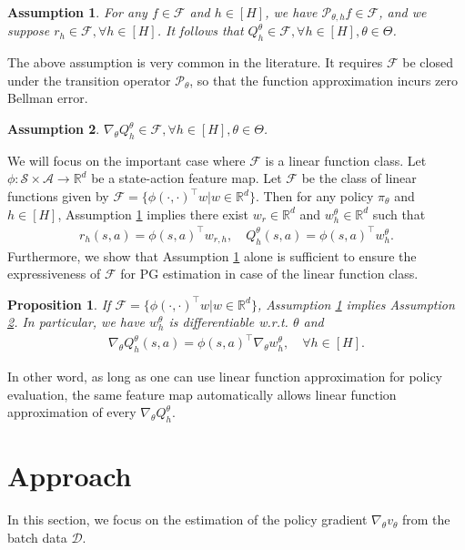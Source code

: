 \documentclass{article}
\newtheorem{assumption}{Assumption}[section]
\newtheorem{proposition}{Proposition}[section]
\numberwithin{equation}{section}
\begin{document}
\begin{assumption}
\label{fclass}
For any $f\in\mathcal{F}$ and $h\in[H]$, we have $\mathcal{P}_{\theta, h} f\in\mathcal{F}$, and we suppose $r_h\in\mathcal{F}, \forall h\in[H]$. It follows that $Q^{\theta}_h\in\mathcal{F}, \forall h\in[H],\theta\in\Theta$.
\end{assumption}
The above assumption is very common in the literature. It requires $\mathcal{F}$ be closed under the transition operator $\mathcal{P}_\theta$, so that the function approximation incurs zero Bellman error. 
\begin{assumption}
\label{gclass}
$\nabla_\theta Q^\theta_h\in\mathcal{F},\forall h\in[H], \theta\in\Theta$. 
\end{assumption}
We will focus on the important case where $\mathcal{F}$ is a linear function class.
Let $\phi:\mathcal{S}\times\mathcal{A}\rightarrow\mathbb{R}^d$ be a state-action feature map. Let $\mathcal{F}$ be the class of linear functions given by $\mathcal{F}=\{\phi(\cdot,\cdot)^\top w\vert w\in\mathbb{R}^d\}$. Then for any policy $\pi_\theta$ and $h\in[H]$, Assumption \ref{fclass} implies there exist $w_r\in\mathbb{R}^d$ and $w_h^\theta\in\mathbb{R}^d$ such that
\begin{align*}
    r_h(s,a)=\phi(s,a)^\top w_{r,h},\quad Q_h^\theta(s,a)=\phi(s,a)^\top w_h^\theta. 
\end{align*}
Furthermore, we show that Assumption \ref{fclass} alone is sufficient to ensure the expressiveness of $\mathcal{F}$ for PG estimation in case of the linear function class. 
\begin{proposition}
\label{lin_rep}
If $\mathcal{F}=\{\phi(\cdot,\cdot)^\top w\vert w\in\mathbb{R}^d\}$, Assumption \ref{fclass} implies Assumption \ref{gclass}. In particular, we have $w_h^\theta$ is differentiable w.r.t. $\theta$ and
\begin{align*}
    \nabla_\theta Q_h^\theta(s, a) = \phi(s, a)^\top \nabla_\theta w_h^\theta,\quad \forall h\in[H]. 
\end{align*}
\end{proposition}
In other word, as long as one can use linear function approximation for policy evaluation, the same feature map automatically allows linear function approximation of every $ \nabla_\theta Q_h^\theta$.

\section{Approach}
In this section, we focus on the estimation of the policy gradient $\nabla_\theta v_\theta$ from the batch data $\mathcal{D}$. %
\end{document}
